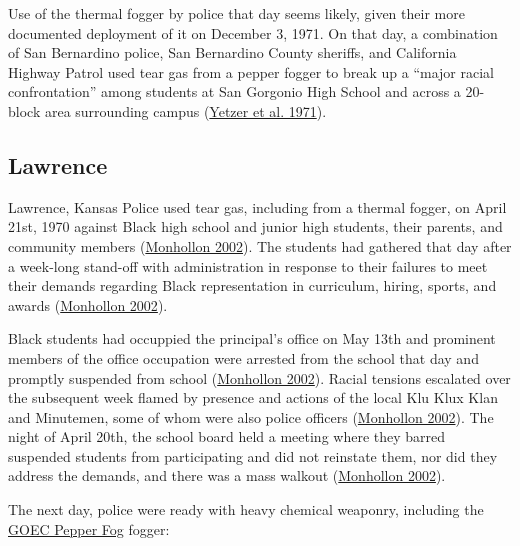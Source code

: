 \documentclass[
  11pt,
]{krantz}
\begin{document}
Use of the thermal fogger by police that day seems likely, given their more documented deployment of it on December 3, 1971.
On that day, a combination of San Bernardino police, San Bernardino County sheriffs, and California Highway Patrol used tear gas from a pepper fogger to break up a ``major racial confrontation'' among students at San Gorgonio High School and across a 20-block area surrounding campus (\protect\hyperlink{ref-Yetzeretal1971}{Yetzer et al. 1971}).

\hypertarget{Lawrence1970_04_21}{%
\subsection{Lawrence}\label{Lawrence1970_04_21}}

Lawrence, Kansas Police used tear gas, including from a thermal fogger, on April 21st, 1970 against Black high school and junior high students, their parents, and community members (\protect\hyperlink{ref-Monhollon2002}{Monhollon 2002}).
The students had gathered that day after a week-long stand-off with administration in response to their failures to meet their demands regarding Black representation in curriculum, hiring, sports, and awards (\protect\hyperlink{ref-Monhollon2002}{Monhollon 2002}).

Black students had occuppied the principal's office on May 13th and prominent members of the office occupation were arrested from the school that day and promptly suspended from school (\protect\hyperlink{ref-Monhollon2002}{Monhollon 2002}).
Racial tensions escalated over the subsequent week flamed by presence and actions of the local Klu Klux Klan and Minutemen, some of whom were also police officers (\protect\hyperlink{ref-Monhollon2002}{Monhollon 2002}).
The night of April 20th, the school board held a meeting where they barred suspended students from participating and did not reinstate them, nor did they address the demands, and there was a mass walkout (\protect\hyperlink{ref-Monhollon2002}{Monhollon 2002}).

The next day, police were ready with heavy chemical weaponry, including the \protect\hyperlink{GOEC}{GOEC Pepper Fog} fogger:
\end{document}
